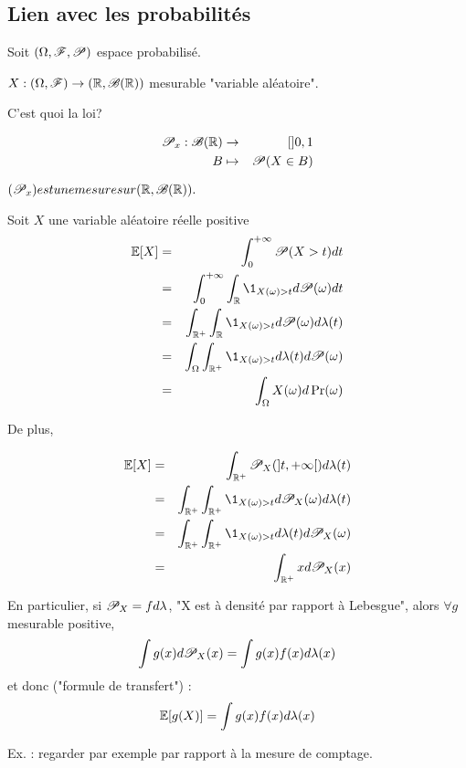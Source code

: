 \subsection{Lien avec les probabilités}




Soit $(\Omega, \mathscr{F}, \mathscr{P})$ espace probabilisé.

$X : (\Omega,    \mathscr{F}) \to (\mathbb{R},  \mathscr{B}(\mathbb{R})) $ mesurable "variable aléatoire".

C'est quoi la loi?

\begin{eqnarray*}
	\mathscr{P}_x: \mathscr{B} (\mathbb{R}) &\to& []0,1 \\
	B &\mapsto& \mathscr{P}(X  \in B)
\end{eqnarray*}

$(\mathscr{P}_x) est une mesure sur (\mathbb{R},  \mathscr{B}(\mathbb{R})).$ 

Soit $X$ une variable aléatoire réelle positive\\
\begin{eqnarray*}
	\E[X] &=& \int_0^{+\infty} \Pro (X> t) d t\\
	&=& \int_0^{+\infty}\int_\R \1_{X(\omega)>t}d \Pro (\omega) d t\\
	&=& \int_{\R^+} \int_{\R} \1_{X(\omega)>t}d \Pro (\omega) d \lambda(t) \\ %
	&=& \int_{\Omega} \int_{\R^+} \1_{X(\omega)>t}d \lambda(t) d \Pro (\omega)  \\%
	&=& \int_{\Omega} X(\omega) d \Pr(\omega)
\end{eqnarray*}

De plus,


\begin{eqnarray*}
	\E[X] &=& \int_{\R^+} \Pro_X(]t, +\infty[) d \lambda (t) \\
	&=& \int_{\R^+} \int_{\R^+} \1_{X(\omega)>t}d \Pro_X (\omega) d \lambda(t) \\
	&=& \int_{\R^+} \int_{\R^+} \1_{X(\omega)>t}d \lambda(t) d\Pro_X (\omega)  \\ %
	&=& \int_{\R^+} x d\Pro_X (x)
\end{eqnarray*}

En particulier, si $\mathscr{P}_X = fd\lambda$, "X est à densité par rapport à Lebesgue", alors $\forall g$ mesurable positive,
$$\int g(x) d \mathscr{P}_X(x) = \int g(x) f(x) d \lambda(x)$$
et donc ("formule de transfert") : 
$$ \mathbb{E}[g(X)] = \int g(x) f(x) d \lambda(x)$$

Ex. : regarder par exemple par rapport à la mesure de comptage.



